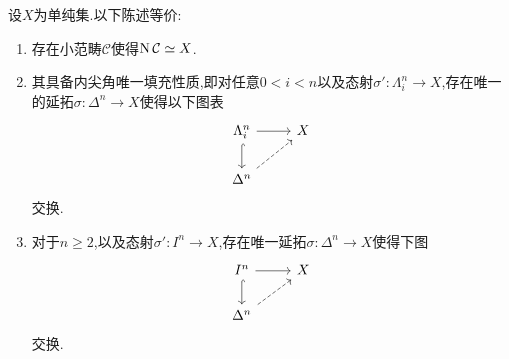 \begin{proposition}[脉的刻画]\label{Pro:脉的刻画}
    设$X$为单纯集.以下陈述等价:
    \begin{enumerate}
        \item 存在小范畴$\mathcal{C}$使得$\operatorname{N} \mathcal{C} \simeq X$.
        \item 其具备内尖角唯一填充性质,即对任意$0<i<n$以及态射$\sigma' : \Lambda_i^n \to X$,存在唯一的延拓$\sigma : \Delta^n \to X$使得以下图表
        \[\begin{tikzcd}
	{\Lambda_i^n} & X \\
	{\Delta^n}
	\arrow[from=1-1, to=1-2]
	\arrow[hook, from=1-1, to=2-1]
	\arrow[dashed, from=2-1, to=1-2]
        \end{tikzcd}\]
        交换.
        \item 对于$n \geq 2$,以及态射$\sigma' :I^n \to X$,存在唯一延拓$\sigma:\Delta^n \to X$使得下图
        \[\begin{tikzcd}
	{I^n} & X \\
	{\Delta^n}
	\arrow[from=1-1, to=1-2]
	\arrow[hook, from=1-1, to=2-1]
	\arrow[dashed, from=2-1, to=1-2]
        \end{tikzcd}\]
        交换.
    \end{enumerate}
\end{proposition}  

